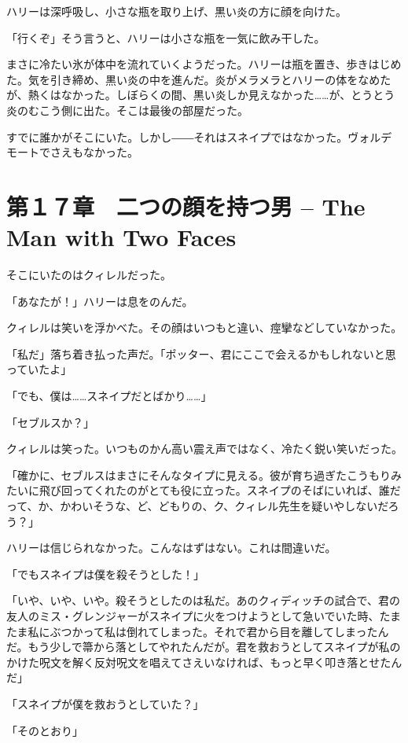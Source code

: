 \documentclass[10pt,a4paper]{article}
\begin{document}
\begin{CJK}{UTF8}{min}
ハリーは深呼吸し、小さな瓶を取り上げ、黒い炎の方に顔を向けた。

「行くぞ」そう言うと、ハリーは小さな瓶を一気に飲み干した。

まさに冷たい氷が体中を流れていくようだった。ハリーは瓶を置き、歩きはじめた。気を引き締め、黒い炎の中を進んだ。炎がメラメラとハリーの体をなめたが、熱くはなかった。しぼらくの間、黒い炎しか見えなかった……が、とうとう炎のむこう側に出た。そこは最後の部屋だった。

すでに誰かがそこにいた。しかし――それはスネイプではなかった。ヴォルデモートでさえもなかった。




\section{第１７章　二つの顔を持つ男 -- The Man with Two Faces}





そこにいたのはクィレルだった。

「あなたが！」ハリーは息をのんだ。

クィレルは笑いを浮かべた。その顔はいつもと違い、痙攣などしていなかった。

「私だ」落ち着き払った声だ。「ポッター、君にここで会えるかもしれないと思っていたよ」

「でも、僕は……スネイプだとばかり……」

「セブルスか？」

クィレルは笑った。いつものかん高い震え声ではなく、冷たく鋭い笑いだった。

「確かに、セブルスはまさにそんなタイプに見える。彼が育ち過ぎたこうもりみたいに飛び回ってくれたのがとても役に立った。スネイプのそばにいれば、誰だって、か、かわいそうな、ど、どもりの、ク、クィレル先生を疑いやしないだろう？」

ハリーは信じられなかった。こんなはずはない。これは間違いだ。

「でもスネイプは僕を殺そうとした！」

「いや、いや、いや。殺そうとしたのは私だ。あのクィディッチの試合で、君の友人のミス・グレンジャーがスネイプに火をつけようとして急いでいた時、たまたま私にぶつかって私は倒れてしまった。それで君から目を離してしまったんだ。もう少しで箒から落としてやれたんだが。君を救おうとしてスネイプが私のかけた呪文を解く反対呪文を唱えてさえいなければ、もっと早く叩き落とせたんだ」

「スネイプが僕を救おうとしていた？」

「そのとおり」


\end{CJK}
\end{document}
